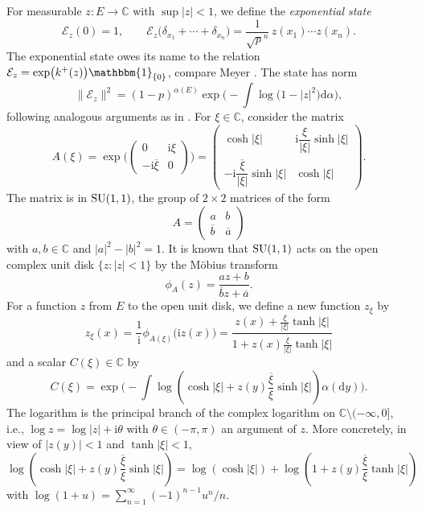 \documentclass[pdftex]{sigma}
\numberwithin{equation}{section}
\newcommand{\C}{\mathbb{C}}
\newcommand{\dd}{\mathrm{d}} %
\newcommand{\1}{\mathbbm{1}}
\begin{document}
For measurable $z\colon E\to \C$ with $\sup |z|<1$, we define the \emph{exponential state}
\[
	\mathcal E_z(0) = 1, \qquad \mathcal E_z\bigl(\delta_{x_1}+\cdots + \delta_{x_n}\bigr) = \frac{1}{\sqrt p^n} \, z(x_1)\cdots z(x_n).
\]
The exponential state owes its name to the relation $\mathcal E_z = \exp\bigl( k^+(z)\bigr)\1_{\{0\}}$, compare Meyer \mbox{\cite[Sec\-tion IV.1]{meyer2006quantum}}. The state has norm
\[
	\|\mathcal E_z\|^2 = (1-p)^{\alpha(E)} \exp\biggl( - \int \log \bigl(1-|z|^2\bigr) \dd \alpha \biggr),
\]
following analogous arguments as in \cite[equation~(5.7)]{IntertwiningConsistent}. For $\xi\in \C$, consider the matrix
\[
	A(\xi) = \exp\biggl( \begin{pmatrix} 0 & \mathrm i \xi \\ - \mathrm i \overline{\xi} &0 \end{pmatrix}\biggr)
	= \begin{pmatrix} \cosh |\xi| & \mathrm i \dfrac{\xi}{|\xi|} \sinh |\xi| \\
	- \mathrm i \dfrac{\overline{\xi}}{|\xi|} \sinh |\xi| & \cosh |\xi|\end{pmatrix}.
\]
The matrix is in ${\rm SU}(1,1)$, the group of $2\times 2$ matrices of the form
\[
	A = \begin{pmatrix} a & b \\ \overline b & \overline a \end{pmatrix}
\]
with $a,b\in \C$ and $|a|^2 - |b|^2 = 1$. It is known that ${\rm SU}(1,1)$ acts on the open complex unit disk $\{z\colon|z|<1\}$ by the M{\"o}bius transform
\[
	\phi_A(z) = \frac{a z + b}{\overline b z + \overline a}.
\]
For a function $z$ from $E$ to the open unit disk, we define a new function $z_\xi$ by
\[
	z_\xi(x) = \frac 1 {\mathrm i} \phi_{A(\xi)}\bigl(\mathrm i z(x)\bigr)
	= \frac{z(x) + \frac{\xi}{|\xi|} \tanh |\xi|}{1+ z(x) \frac{\overline{\xi}}{|\xi|} \tanh |\xi| }
\]
and a scalar $C(\xi) \in \mathbb C$ by
\[
	C(\xi) = \exp\biggl( - \int \log\left( \cosh |\xi| + z(y) \frac{\overline \xi}{\xi} \sinh |\xi|\right) \alpha(\dd y) \biggr).
\]
The logarithm is the principal branch of the complex logarithm on $\C \setminus (-\infty,0]$, i.e., $\log z = \log |z| +\mathrm i \theta$ with $\theta\in (-\pi,\pi)$ an argument of $z$. More concretely, in view of $|z(y)|<1$ and $\tanh|\xi|<1$,
\[
	\log\left( \cosh |\xi| + z(y) \frac{\overline \xi}{\xi} \sinh |\xi|\right)
	= \log (\cosh|\xi|) + \log \left( 1 + z(y) \frac{\overline \xi}{\xi} \tanh |\xi|\right)
\]
with $\log(1+u) = \sum_{n=1}^\infty (-1)^{n-1} u^n/n$.
\end{document}
